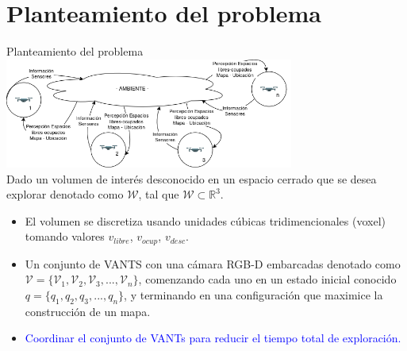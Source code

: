 \documentclass[
  24pt, %
  aspectratio=169, %
]{beamer}
\begin{document}
\section{Planteamiento del problema}
\begin{frame}{Planteamiento del problema}
  \vspace{2mm}
  \centering
  \includegraphics[width=9.5cm]{problema}\\
  \justifying
  \small Dado un volumen de interés desconocido en un espacio cerrado que se desea explorar denotado como $\mathcal{W}$, tal que $\mathcal{W} \subset \mathbb{R}^{3}$.\\
  \begin{itemize}
  \item El volumen se discretiza usando unidades cúbicas tridimencionales (voxel) tomando valores $v_{libre}$, $v_{ocup}$, $v_{desc}$.
  \item Un conjunto de VANTS con una cámara RGB-D embarcadas denotado como $\mathcal{V} = \{\mathcal{V}_{1},\mathcal{V}_{2},\mathcal{V}_{3},...,\mathcal{V}_{n}\}$, comenzando cada uno en un estado inicial conocido $q = \{q_{1},q_{2},q_{3},...,q_{n}\}$, y terminando en una configuración que maximice la construcción de un mapa.\\
  \item \textcolor{blue}{Coordinar el conjunto de VANTs para reducir el tiempo total de exploración.}
  \end{itemize}
      

\end{frame}
\end{document}
